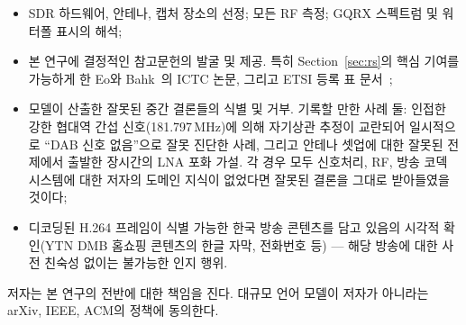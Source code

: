\documentclass[11pt,a4paper]{article}
\begin{document}
\begin{itemize}[leftmargin=*,nosep]
\item SDR 하드웨어, 안테나, 캡처 장소의 선정; 모든 RF 측정;
       GQRX 스펙트럼 및 워터폴 표시의 해석;
\item 본 연구에 결정적인 참고문헌의 발굴 및 제공.  특히 Section~\ref{sec:rs}의
       핵심 기여를 가능하게 한 Eo와 Bahk~\cite{eo2024tdmb}의 ICTC
       논문, 그리고 ETSI 등록 표 문서~\cite{etsi300401};
\item 모델이 산출한 잘못된 중간 결론들의 식별 및 거부.  기록할 만한
       사례 둘: 인접한 강한 협대역 간섭 신호(181.797\,MHz)에 의해
       자기상관 추정이 교란되어 일시적으로 ``DAB 신호 없음''으로 잘못
       진단한 사례, 그리고 안테나 셋업에 대한 잘못된 전제에서 출발한
       장시간의 LNA 포화 가설.  각 경우 모두 신호처리, RF, 방송
       코덱 시스템에 대한 저자의 도메인 지식이 없었다면 잘못된 결론을
       그대로 받아들였을 것이다;
\item 디코딩된 H.264 프레임이 식별 가능한 한국 방송 콘텐츠를
       담고 있음의 시각적 확인(YTN DMB 홈쇼핑 콘텐츠의 한글 자막,
       전화번호 등) --- 해당 방송에 대한 사전 친숙성 없이는 불가능한
       인지 행위.
\end{itemize}

저자는 본 연구의 전반에 대한 책임을 진다.  대규모 언어 모델이 저자가
아니라는 arXiv, IEEE, ACM의 정책에 동의한다.

\printbibliography
\end{document}
